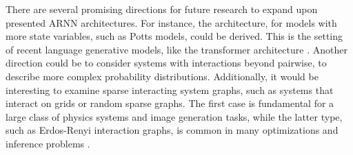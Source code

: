 \documentclass[aps,physrev,10pt,floatfix,reprint]{revtex4-2}
\begin{document}
There are several promising directions for future research to expand upon presented ARNN architectures. For instance, the architecture, for models with more state variables, such as Potts models, could be derived. This is the setting of recent language generative models, like the transformer architecture \cite{https://doi.org/10.48550/arxiv.2005.14165}. Another direction could be to consider systems with interactions beyond pairwise, to describe more complex probability distributions. Additionally, it would be interesting to examine sparse interacting system graphs, such as systems that interact on grids or random sparse graphs. The first case is fundamental for a large class of physics systems and image generation tasks, while the latter type, such as Erdos-Renyi interaction graphs, is common in many optimizations \cite{doi:10.1126/science.1073287} and inference problems \cite{Biazzo2022}. 
%

\end{document}
